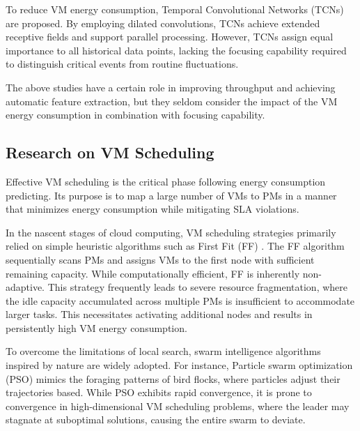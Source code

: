 \documentclass[conference]{{IEEEtran}}
\begin{document}
To reduce VM energy consumption, Temporal Convolutional Networks (TCNs) \cite{wu2024hotspot} are proposed. By employing dilated convolutions, TCNs achieve extended receptive fields and support parallel processing. However, TCNs assign equal importance to all historical data points, lacking the focusing capability required to distinguish critical events from routine fluctuations.

The above studies have a certain role in improving throughput and achieving automatic feature extraction, but they seldom consider the impact of the VM energy consumption in combination with focusing capability.

\subsection{Research on VM Scheduling}

Effective VM scheduling is the critical phase following energy consumption predicting. Its purpose is to map a large number of VMs to PMs in a manner that minimizes energy consumption while mitigating SLA violations.

In the nascent stages of cloud computing, VM scheduling strategies primarily relied on simple heuristic algorithms such as First Fit (FF) \cite{wan2010first}. The FF algorithm sequentially scans PMs and assigns VMs to the first node with sufficient remaining capacity. While computationally efficient, FF is inherently non-adaptive. This strategy frequently leads to severe resource fragmentation, where the idle capacity accumulated across multiple PMs is insufficient to accommodate larger tasks. This necessitates activating additional nodes and results in persistently high VM energy consumption.

To overcome the limitations of local search, swarm intelligence algorithms inspired by nature are widely adopted. For instance, Particle swarm optimization (PSO) \cite{ishaque2012improved} mimics the foraging patterns of bird flocks, where particles adjust their trajectories based. While PSO exhibits rapid convergence, it is prone to convergence in high-dimensional VM scheduling problems, where the leader may stagnate at suboptimal solutions, causing the entire swarm to deviate.
\end{document}
